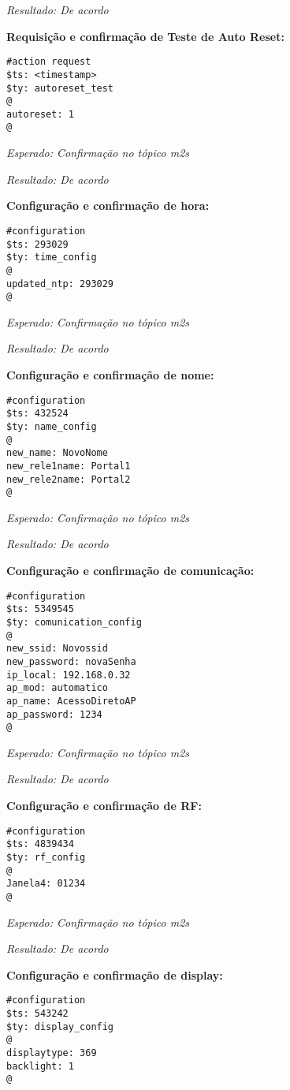 \textit{Resultado: De acordo}

\textbf{Requisição e confirmação de Teste de Auto Reset:}
\begin{lstlisting}
#action request
$ts: <timestamp>
$ty: autoreset_test
@
autoreset: 1
@
\end{lstlisting}

\textit{Esperado: Confirmação no tópico \wmqtt{} m2s}

\textit{Resultado: De acordo}

\textbf{Configuração e confirmação de hora:}
\begin{lstlisting}
#configuration
$ts: 293029
$ty: time_config
@
updated_ntp: 293029
@
\end{lstlisting}

\textit{Esperado: Confirmação no tópico \wmqtt{} m2s}

\textit{Resultado: De acordo}

\textbf{Configuração e confirmação de nome:}
\begin{lstlisting}
#configuration
$ts: 432524
$ty: name_config
@
new_name: NovoNome
new_rele1name: Portal1
new_rele2name: Portal2
@
\end{lstlisting}

\textit{Esperado: Confirmação no tópico \wmqtt{} m2s}

\textit{Resultado: De acordo}

\textbf{Configuração e confirmação de comunicação:}
\begin{lstlisting}
#configuration
$ts: 5349545
$ty: comunication_config
@
new_ssid: Novossid
new_password: novaSenha
ip_local: 192.168.0.32
ap_mod: automatico
ap_name: AcessoDiretoAP
ap_password: 1234
@
\end{lstlisting}

\textit{Esperado: Confirmação no tópico \wmqtt{} m2s}

\textit{Resultado: De acordo}

\textbf{Configuração e confirmação de RF:}
\begin{lstlisting}
#configuration
$ts: 4839434
$ty: rf_config
@
Janela4: 01234
@
\end{lstlisting}

\textit{Esperado: Confirmação no tópico \wmqtt{} m2s}

\textit{Resultado: De acordo}

\textbf{Configuração e confirmação de display:}
\begin{lstlisting}
#configuration
$ts: 543242
$ty: display_config
@
displaytype: 369
backlight: 1
@
\end{lstlisting}

